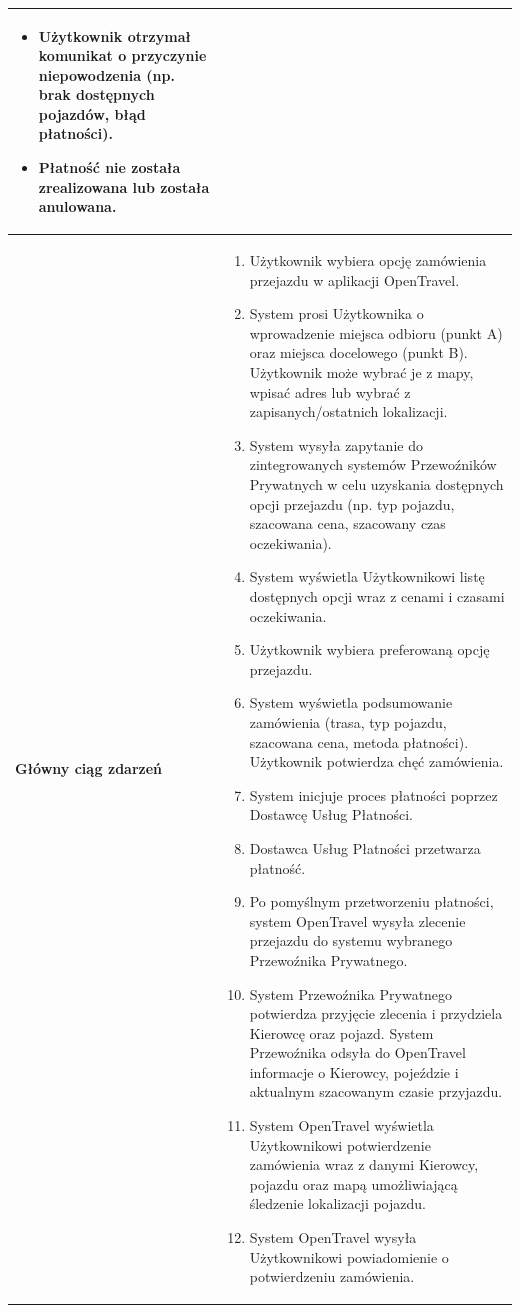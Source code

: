 \documentclass[a4paper,12pt]{article}
\begin{document}
\begin{longtable}{|p{\pierwszakolumnaszerokoscPUTPTZamow}|p{\drugakolumnaszerokoscPUTPTZamow}|}
\begin{itemize}
            \item Użytkownik otrzymał komunikat o przyczynie niepowodzenia (np. brak dostępnych pojazdów, błąd płatności).
            \item Płatność nie została zrealizowana lub została anulowana.
        \end{itemize} \\
    \hline
    \textbf{Główny ciąg zdarzeń} &
        \begin{enumerate} \itemsep0pt \parskip0pt \parsep0pt
            \item Użytkownik wybiera opcję zamówienia przejazdu w aplikacji OpenTravel.
            \item System prosi Użytkownika o wprowadzenie miejsca odbioru (punkt A) oraz miejsca docelowego (punkt B). Użytkownik może wybrać je z mapy, wpisać adres lub wybrać z zapisanych/ostatnich lokalizacji.
            \item System wysyła zapytanie do zintegrowanych systemów Przewoźników Prywatnych w celu uzyskania dostępnych opcji przejazdu (np. typ pojazdu, szacowana cena, szacowany czas oczekiwania).
            \item System wyświetla Użytkownikowi listę dostępnych opcji wraz z cenami i czasami oczekiwania.
            \item Użytkownik wybiera preferowaną opcję przejazdu.
            \item System wyświetla podsumowanie zamówienia (trasa, typ pojazdu, szacowana cena, metoda płatności). Użytkownik potwierdza chęć zamówienia.
            \item System inicjuje proces płatności poprzez Dostawcę Usług Płatności.
            \item Dostawca Usług Płatności przetwarza płatność.
            \item Po pomyślnym przetworzeniu płatności, system OpenTravel wysyła zlecenie przejazdu do systemu wybranego Przewoźnika Prywatnego.
            \item System Przewoźnika Prywatnego potwierdza przyjęcie zlecenia i przydziela Kierowcę oraz pojazd. System Przewoźnika odsyła do OpenTravel informacje o Kierowcy, pojeździe i aktualnym szacowanym czasie przyjazdu.
            \item System OpenTravel wyświetla Użytkownikowi potwierdzenie zamówienia wraz z danymi Kierowcy, pojazdu oraz mapą umożliwiającą śledzenie lokalizacji pojazdu.
            \item System OpenTravel wysyła Użytkownikowi powiadomienie o potwierdzeniu zamówienia.

\end{enumerate}
\end{longtable}
\end{document}
